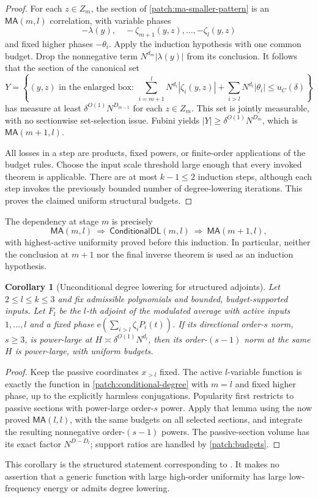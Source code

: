 \documentclass[11pt]{article}
\newtheorem{corollary}[corollary]{Corollary}
\theoremstyle{definition}
\newcommand{\ee}[1]{\mathrm e\!\left(#1\right)}
\begin{document}
\begin{proof}
For each $z\in Z_m$, the section of \eqref{patch:ma-smaller-pattern} is an
$\mathsf{MA}(m,l)$ correlation, with variable phases
\[
 -\lambda(y),\quad -\zeta_{m+1}(y,z),\ldots,-\zeta_l(y,z)
\]
and fixed higher phases $-\theta_i$.
Apply the induction hypothesis with one common budget.  Drop the nonnegative term
$N^{d_m}|\lambda(y)|$ from its conclusion.  It follows that the section of the canonical set
\[
 Y=\left\{(y,z)\text{ in the enlarged box}:\
       \sum_{i=m+1}^lN^{d_i}|\zeta_i(y,z)|+
       \sum_{i>l}N^{d_i}|\theta_i|\leq u_C(\delta)\right\}
\]
has measure at least $\delta^{O(1)}N^{D_{m-1}}$ for each $z\in Z_m$.
This set is jointly measurable, with no sectionwise set-selection issue.
Fubini yields $|Y|\geq\delta^{O(1)}N^{D_m}$, which is $\mathsf{MA}(m+1,l)$.

All losses in a step are products, fixed powers, or finite-order applications of the budget
rules.  Choose the input scale threshold large enough that every invoked theorem is
applicable.  There are at most $k-1\leq2$ induction steps, although each step invokes the
previously bounded number of degree-lowering iterations.  This proves the claimed uniform
structural budgets.
\end{proof}

The dependency at stage $m$ is precisely
\[
 \mathsf{MA}(m,l)
 \ \Longrightarrow\ \mathsf{ConditionalDL}(m,l)
 \ \Longrightarrow\ \mathsf{MA}(m+1,l),
\]
with highest-active uniformity proved before this induction.  In particular, neither the
conclusion at $m+1$ nor the final inverse theorem is used as an induction hypothesis.

\begin{corollary}[Unconditional degree lowering for structured adjoints]
\label{patch:structured-degree}
Let $2\leq l\leq k\leq3$ and fix admissible polynomials and bounded, budget-supported inputs.
Let $F_l$ be the $l$-th adjoint of the modulated average with active inputs $1,\ldots,l$
and a fixed phase $\ee{\sum_{i>l}\zeta_iP_i(t)}$.  If its directional order-$s$ norm,
$s\geq3$, is power-large at $H\asymp\delta^{O(1)}N^{d_l}$, then its order-$(s-1)$ norm
at the same $H$ is power-large, with uniform budgets.
\end{corollary}
\begin{proof}
Keep the passive coordinates $x_{>l}$ fixed.  The active $l$-variable function is exactly
the function in \cref{patch:conditional-degree} with $m=l$ and fixed higher phase,
up to the explicitly harmless conjugations.  Popularity first restricts to passive sections
with power-large order-$s$ power.  Apply that lemma using the now proved
$\mathsf{MA}(l,l)$, with the same budgets on all selected sections, and integrate the
resulting nonnegative order-$(s-1)$ powers.  The passive-section volume has its exact factor
$N^{D-D_l}$; support ratios are handled by \cref{patch:budgets}.
\end{proof}
This corollary is the structured statement corresponding to \cite[Lemma 4.70]{KoszEtAl}.
It makes no assertion that a generic function with large high-order uniformity has large
low-frequency energy or admits degree lowering.
\end{document}
